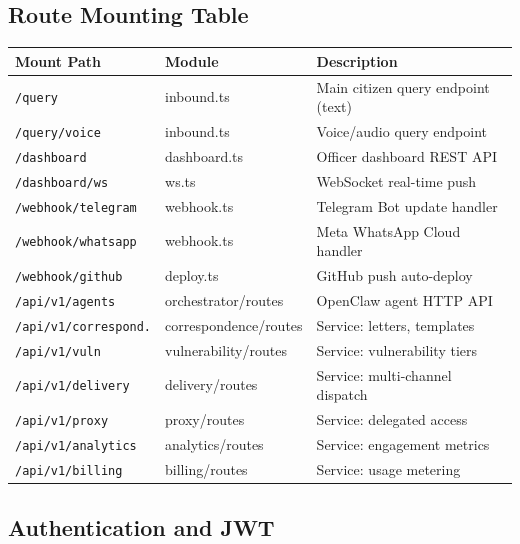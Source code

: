 \documentclass[12pt,a4paper]{article}
\begin{document}
\subsection{Route Mounting Table}

\begin{tabular}{@{}llp{6cm}@{}}
\toprule
\textbf{Mount Path} & \textbf{Module} & \textbf{Description} \\
\midrule
\texttt{/query}              & inbound.ts           & Main citizen query endpoint (text) \\
\texttt{/query/voice}        & inbound.ts           & Voice/audio query endpoint \\
\texttt{/dashboard}          & dashboard.ts         & Officer dashboard REST API \\
\texttt{/dashboard/ws}       & ws.ts                & WebSocket real-time push \\
\texttt{/webhook/telegram}   & webhook.ts           & Telegram Bot update handler \\
\texttt{/webhook/whatsapp}   & webhook.ts           & Meta WhatsApp Cloud handler \\
\texttt{/webhook/github}     & deploy.ts            & GitHub push auto-deploy \\
\texttt{/api/v1/agents}      & orchestrator/routes  & OpenClaw agent HTTP API \\
\texttt{/api/v1/correspond.} & correspondence/routes & Service: letters, templates \\
\texttt{/api/v1/vuln}        & vulnerability/routes  & Service: vulnerability tiers \\
\texttt{/api/v1/delivery}    & delivery/routes      & Service: multi-channel dispatch \\
\texttt{/api/v1/proxy}       & proxy/routes         & Service: delegated access \\
\texttt{/api/v1/analytics}   & analytics/routes     & Service: engagement metrics \\
\texttt{/api/v1/billing}     & billing/routes       & Service: usage metering \\
\bottomrule
\end{tabular}

\subsection{Authentication and JWT}
\end{document}
